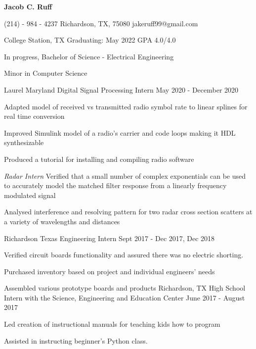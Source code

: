 \documentclass[11pt]{article} %
\begin{document}
\centerline{{\Huge \bf Jacob C. Ruff}}

\bigskip

	{(214) - 984 - 4237}
        {Richardson, TX, 75080}
        {jakeruff99@gmail.com}

\begin{description}
\squish
{}
           {College Station, TX}
           {Graduating: May 2022}
	   {GPA 4.0/4.0}


In progress, Bachelor of Science - Electrical Engineering

Minor in Computer Science

\end{description}



\begin{description}
\squish

	   {Laurel Maryland}
           {Digital Signal Processing Intern}
           {May 2020 - December 2020}

	   Adapted model of received  vs transmitted radio symbol rate to linear splines for real time conversion

	   Improved Simulink model of a radio's carrier and code loops making it HDL synthesizable

	   Produced a tutorial for installing and compiling radio software


		\emph{Radar Intern}
		Verified that a small number of complex exponentials can be used to accurately model the matched filter response from a linearly frequency modulated signal

		Analysed interference and resolving pattern for two radar cross section scatters at a variety of wavelengths and distances 



	   {Richardson Texas}
           {Engineering Intern}
           {Sept 2017 - Dec 2017, Dec 2018}

	Verified circuit boards functionality and assured there was no electric shorting.

	Purchased inventory based on project and individual engineers' needs

	Assembled various prototype boards and products
		{Richardson, TX}
		{High School Intern with the Science, Engineering and Education Center}
		{June 2017 - August 2017}

		Led creation of instructional manuals for teaching kids how to program

		Assisted in instructing beginner's Python class.

\end{description}
\end{document}
